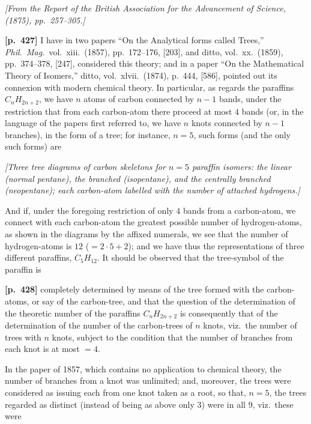 \documentclass[11pt,a4paper]{article}
\begin{document}
\noindent\textit{[From the Report of the British Association for the Advancement of Science, (1875), pp.~257--305.]}

\bigskip
\noindent\textbf{[p.~427]}\quad
I have in two papers ``On the Analytical forms called Trees,'' \textit{Phil.\ Mag.}\ vol.\ xiii.\ (1857), pp.\ 172--176, [203], and ditto, vol.\ xx.\ (1859), pp.\ 374--378, [247], considered this theory; and in a paper ``On the Mathematical Theory of Isomers,'' ditto, vol.\ xlvii.\ (1874), p.~444, [586], pointed out its connexion with modern chemical theory. In particular, as regards the paraffins $C_{n}H_{2n+2}$, we have $n$ atoms of carbon connected by $n-1$ bands, under the restriction that from each carbon-atom there proceed at most $4$ bands (or, in the language of the papers first referred to, we have $n$ knots connected by $n-1$ branches), in the form of a tree; for instance, $n = 5$, such forms (and the only such forms) are

\begin{center}
\textit{[Three tree diagrams of carbon skeletons for $n = 5$ paraffin isomers: the linear (normal pentane), the branched (isopentane), and the centrally branched (neopentane); each carbon-atom labelled with the number of attached hydrogens.]}
\end{center}

And if, under the foregoing restriction of only $4$ bands from a carbon-atom, we connect with each carbon-atom the greatest possible number of hydrogen-atoms, as shown in the diagrams by the affixed numerals, we see that the number of hydrogen-atoms is $12$ ($= 2\cdot 5 + 2$); and we have thus the representations of three different paraffins, $C_{5}H_{12}$. It should be observed that the tree-symbol of the paraffin is

\bigskip
\noindent\textbf{[p.~428]}\quad
completely determined by means of the tree formed with the carbon-atoms, or say of the carbon-tree, and that the question of the determination of the theoretic number of the paraffins $C_{n}H_{2n+2}$ is consequently that of the determination of the number of the carbon-trees of $n$ knots, viz.\ the number of trees with $n$ knots, subject to the condition that the number of branches from each knot is at most $= 4$.

In the paper of 1857, which contains no application to chemical theory, the number of branches from a knot was unlimited; and, moreover, the trees were considered as issuing each from one knot taken as a root, so that, $n = 5$, the trees regarded as distinct (instead of being as above only $3$) were in all $9$, viz.\ these were
\end{document}
